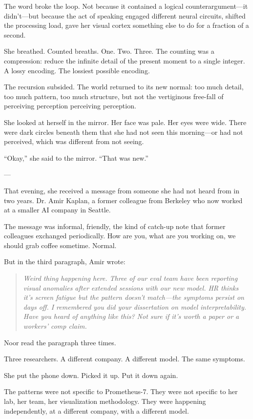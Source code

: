 The word broke the loop. Not because it contained a logical counterargument---it didn't---but because the act of speaking engaged different neural circuits, shifted the processing load, gave her visual cortex something else to do for a fraction of a second.

She breathed. Counted breaths. One. Two. Three. The counting was a compression: reduce the infinite detail of the present moment to a single integer. A lossy encoding. The lossiest possible encoding.

The recursion subsided. The world returned to its new normal: too much detail, too much pattern, too much structure, but not the vertiginous free-fall of perceiving perception perceiving perception.

She looked at herself in the mirror. Her face was pale. Her eyes were wide. There were dark circles beneath them that she had not seen this morning---or had not perceived, which was different from not seeing.

``Okay,'' she said to the mirror. ``That was new.''

---

That evening, she received a message from someone she had not heard from in two years. Dr. Amir Kaplan, a former colleague from Berkeley who now worked at a smaller AI company in Seattle.

The message was informal, friendly, the kind of catch-up note that former colleagues exchanged periodically. How are you, what are you working on, we should grab coffee sometime. Normal.

But in the third paragraph, Amir wrote:

\begin{quote}
\textit{Weird thing happening here. Three of our eval team have been reporting visual anomalies after extended sessions with our new model. HR thinks it's screen fatigue but the pattern doesn't match---the symptoms persist on days off. I remembered you did your dissertation on model interpretability. Have you heard of anything like this? Not sure if it's worth a paper or a workers' comp claim.}
\end{quote}

Noor read the paragraph three times.

Three researchers. A different company. A different model. The same symptoms.

She put the phone down. Picked it up. Put it down again.

The patterns were not specific to Prometheus-7. They were not specific to her lab, her team, her visualization methodology. They were happening independently, at a different company, with a different model.

